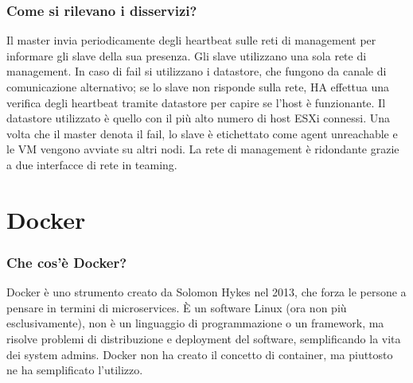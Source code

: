 \documentclass[11pt]{article}
\begin{document}
\subsubsection{Come si rilevano i disservizi?}
Il master invia periodicamente degli heartbeat sulle reti di management per informare gli slave della sua presenza. Gli slave utilizzano una sola rete di management. In caso di fail si utilizzano i datastore, che fungono da canale di comunicazione alternativo; se lo slave non risponde sulla rete, HA effettua una verifica degli heartbeat tramite datastore per capire se l'host è funzionante. Il datastore utilizzato è quello con il più alto numero di host ESXi connessi. Una volta che il master denota il fail, lo slave è etichettato come agent unreachable e le VM vengono avviate su altri nodi. La rete di management è ridondante grazie a due interfacce di rete in teaming. 


\section{Docker}
\subsubsection{Che cos'è Docker?}
Docker è uno strumento creato da Solomon Hykes nel 2013, che forza le persone a pensare in termini di microservices. È un software Linux (ora non più esclusivamente), non è un linguaggio di programmazione o un framework, ma risolve problemi di distribuzione e deployment del software, semplificando la vita dei system admins. Docker non ha creato il concetto di container, ma piuttosto ne ha semplificato l'utilizzo. 
\end{document}
